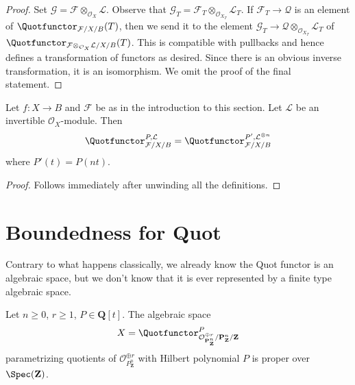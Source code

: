 \begin{proof}
Set $\mathcal{G} = \mathcal{F} \otimes_{\mathcal{O}_X} \mathcal{L}$.
Observe that
$\mathcal{G}_T = \mathcal{F}_T \otimes_{\mathcal{O}_{X_T}} \mathcal{L}_T$.
If $\mathcal{F}_T \to \mathcal{Q}$ is an element of
$\Quotfunctor_{\mathcal{F}/X/B}(T)$, then we send it
to the element
$\mathcal{G}_T \to \mathcal{Q} \otimes_{\mathcal{O}_{X_T}} \mathcal{L}_T$
of
$\Quotfunctor_{\mathcal{F} \otimes_{\mathcal{O}_X} \mathcal{L}/X/B}(T)$.
This is compatible with pullbacks and hence
defines a transformation of functors as desired.
Since there is an obvious inverse transformation,
it is an isomorphism. We omit the proof of the final statement.
\end{proof}

\begin{lemma}
\label{lemma-quot-power-invertible}
Let $f : X \to B$ and $\mathcal{F}$ be as in the introduction to this section.
Let $\mathcal{L}$ be an invertible $\mathcal{O}_X$-module.
Then
$$
\Quotfunctor^{P, \mathcal{L}}_{\mathcal{F}/X/B} =
\Quotfunctor^{P', \mathcal{L}^{\otimes n}}_{\mathcal{F}/X/B}
$$
where $P'(t) = P(nt)$.
\end{lemma}

\begin{proof}
Follows immediately after unwinding all the definitions.
\end{proof}






\section{Boundedness for Quot}
\label{section-quot-bounded}

\noindent
Contrary to what happens classically, we already know the Quot
functor is an algebraic space, but we don't know that it is
ever represented by a finite type algebraic space.

\begin{lemma}
\label{lemma-quot-Pn}
Let $n \geq 0$, $r \geq 1$, $P \in \mathbf{Q}[t]$.
The algebraic space
$$
X = \Quotfunctor^P_{\mathcal{O}^{\oplus r}_{\mathbf{P}^n_\mathbf{Z}}/
\mathbf{P}^n_\mathbf{Z}/\mathbf{Z}}
$$
parametrizing quotients of $\mathcal{O}_{\mathbf{}P^n_\mathbf{Z}}^{\oplus r}$
with Hilbert polynomial $P$ is proper over $\Spec(\mathbf{Z})$.
\end{lemma}

